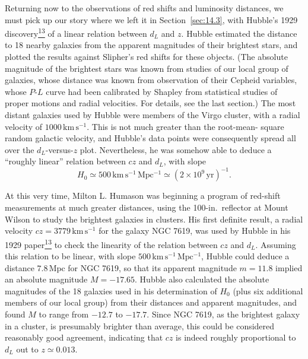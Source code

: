 Returning now to the observations of red shifts and luminosity distances, we
must pick up our story where we left it in Section~\ref{sec:14.3}, with
Hubble's 1929 discovery\hyperref[ch14-ref-13]{\textsuperscript{13}} of a
linear relation between \(d_L\) and \(z\). Hubble estimated the distance to
18 nearby galaxies from the apparent magnitudes of their brightest stars,
and plotted the results against Slipher's red shifts for these objects. (The
absolute magnitude of the brightest stars was known from studies of our local
group of galaxies, whose distance was known from observation of their Cepheid
variables, whose \(P\)-\(L\) curve had been calibrated by Shapley from
statistical studies of proper motions and radial velocities. For details,
see the last section.) The most distant galaxies used by Hubble were members
of the Virgo cluster, with a radial velocity of
\(1000\,\mathrm{km\,s^{-1}}\). This is not much greater than the root-mean-
square random galactic velocity, and Hubble's data points were consequently
spread all over the \(d_L\)-versus-\(z\) plot. Nevertheless, he was somehow
able to deduce a ``roughly linear'' relation between \(cz\) and \(d_L\),
with slope
\[
  H_0
  \simeq
  500\,\mathrm{km\,s^{-1}\,Mpc^{-1}}
  \simeq
  (2\times10^9\,\mathrm{yr})^{-1}.
\]

At this very time, Milton L. Humason was beginning a program of red-shift
measurements at much greater distances, using the 100-in.\ reflector at
Mount Wilson to study the brightest galaxies in clusters. His first definite
result, a radial velocity \(cz=3779\,\mathrm{km\,s^{-1}}\) for the galaxy
NGC 7619, was used by Hubble in his 1929
paper\hyperref[ch14-ref-13]{\textsuperscript{13}} to check the linearity of
the relation between \(cz\) and \(d_L\). Assuming this relation to be linear,
with slope \(500\,\mathrm{km\,s^{-1}\,Mpc^{-1}}\), Hubble could deduce a
distance \(7.8\,\mathrm{Mpc}\) for NGC 7619, so that its apparent magnitude
\(m=11.8\) implied an absolute magnitude \(M=-17.65\). Hubble also
calculated the absolute magnitudes of the 18 galaxies used in his
determination of \(H_0\) (plus six additional members of our local group)
from their distances and apparent magnitudes, and found \(M\) to range from
\(-12.7\) to \(-17.7\). Since NGC 7619, as the brightest galaxy in a
cluster, is presumably brighter than average, this could be considered
reasonably good agreement, indicating that \(cz\) is indeed roughly
proportional to \(d_L\) out to \(z\simeq0.013\).

